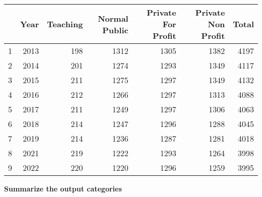\documentclass[12pt]{article}
\begin{document}
\begin{table}
    \begin{tabular}{rrrrrrr}
        \toprule
          & Year & Teaching & Normal Public & Private For Profit & Private Non Profit & Total \\
        \midrule
        1 & 2013 & 198      & 1312          & 1305               & 1382               & 4197  \\
        2 & 2014 & 201      & 1274          & 1293               & 1349               & 4117  \\
        3 & 2015 & 211      & 1275          & 1297               & 1349               & 4132  \\
        4 & 2016 & 212      & 1266          & 1297               & 1313               & 4088  \\
        5 & 2017 & 211      & 1249          & 1297               & 1306               & 4063  \\
        6 & 2018 & 214      & 1247          & 1296               & 1288               & 4045  \\
        7 & 2019 & 214      & 1236          & 1287               & 1281               & 4018  \\
        8 & 2021 & 219      & 1222          & 1293               & 1264               & 3998  \\
        9 & 2022 & 220      & 1220          & 1296               & 1259               & 3995  \\
        \bottomrule
    \end{tabular}
\end{table}

\textbf{Summarize the output categories}
\end{document}
